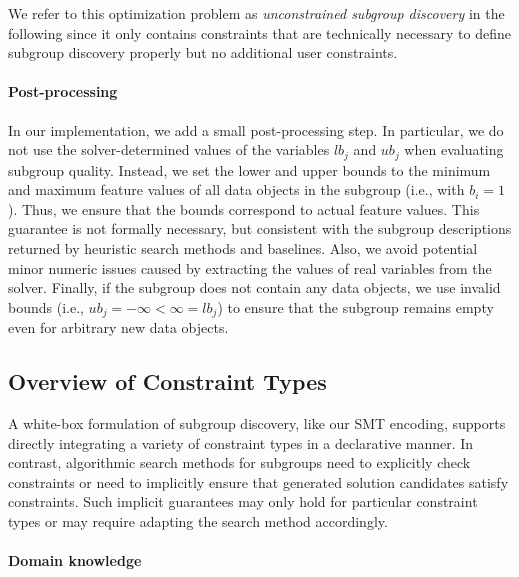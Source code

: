 \documentclass{article}
\theoremstyle{definition}
\begin{document}
We refer to this optimization problem as \emph{unconstrained subgroup discovery} in the following since it only contains constraints that are technically necessary to define subgroup discovery properly but no additional user constraints.

\paragraph{Post-processing}

In our implementation, we add a small post-processing step.
In particular, we do not use the solver-determined values of the variables $\mathit{lb}_j$ and $\mathit{ub}_j$ when evaluating subgroup quality.
Instead, we set the lower and upper bounds to the minimum and maximum feature values of all data objects in the subgroup (i.e., with $b_i=1$).
Thus, we ensure that the bounds correspond to actual feature values.
This guarantee is not formally necessary, but consistent with the subgroup descriptions returned by heuristic search methods and baselines.
Also, we avoid potential minor numeric issues caused by extracting the values of real variables from the solver.
Finally, if the subgroup does not contain any data objects, we use invalid bounds (i.e., $\mathit{ub}_j = -\infty < \infty = \mathit{lb}_j$) to ensure that the subgroup remains empty even for arbitrary new data objects.

\subsection{Overview of Constraint Types}
\label{sec:csd:approach:constraint-types}

A white-box formulation of subgroup discovery, like our SMT encoding, supports directly integrating a variety of constraint types in a declarative manner.
In contrast, algorithmic search methods for subgroups need to explicitly check constraints or need to implicitly ensure that generated solution candidates satisfy constraints.
Such implicit guarantees may only hold for particular constraint types or may require adapting the search method accordingly.

\paragraph{Domain knowledge}
\end{document}
